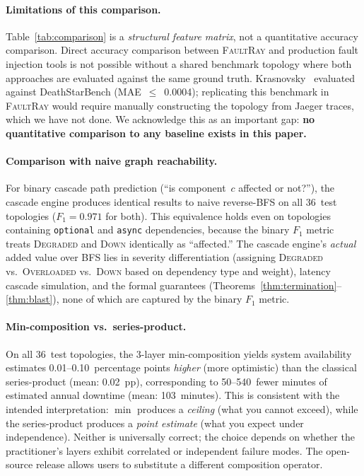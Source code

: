 \documentclass[10pt,twocolumn]{article}
\begin{document}
\paragraph{Limitations of this comparison.}
Table~\ref{tab:comparison} is a \emph{structural feature
matrix}, not a quantitative accuracy comparison. Direct
accuracy comparison between \textsc{FaultRay} and production
fault injection tools is not possible without a shared benchmark
topology where both approaches are evaluated against the same
ground truth. Krasnovsky~\cite{krasnovsky2026} evaluated against
DeathStarBench (MAE~$\leq$~0.0004); replicating this benchmark
in \textsc{FaultRay} would require manually constructing the
topology from Jaeger traces, which we have not done. We
acknowledge this as an important gap: \textbf{no quantitative
comparison to any baseline exists in this paper.}

\paragraph{Comparison with naive graph reachability.}
For binary cascade path prediction (``is component~$c$ affected
or not?''), the cascade engine produces identical results to
naive reverse-BFS on all 36~test topologies ($F_1 = 0.971$ for
both). This equivalence holds even on topologies containing
\texttt{optional} and \texttt{async} dependencies, because the
binary $F_1$ metric treats \textsc{Degraded} and \textsc{Down}
identically as ``affected.'' The cascade engine's \emph{actual}
added value over BFS lies in severity differentiation
(assigning \textsc{Degraded} vs.\ \textsc{Overloaded} vs.\
\textsc{Down} based on dependency type and weight), latency
cascade simulation, and the formal guarantees
(Theorems~\ref{thm:termination}--\ref{thm:blast}), none of
which are captured by the binary $F_1$ metric.

\paragraph{Min-composition vs.\ series-product.}
On all 36~test topologies, the 3-layer min-composition yields
system availability estimates 0.01--0.10~percentage points
\emph{higher} (more optimistic) than the classical
series-product (mean: 0.02~pp), corresponding to
50--540~fewer minutes of estimated annual downtime
(mean: 103~minutes). This is consistent with the
intended interpretation: $\min$ produces a \emph{ceiling}
(what you cannot exceed), while the series-product produces
a \emph{point estimate} (what you expect under independence).
Neither is universally correct; the choice depends on whether
the practitioner's layers exhibit correlated or independent
failure modes. The open-source release allows users to
substitute a different composition operator.
\end{document}
